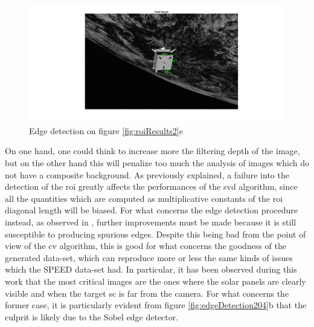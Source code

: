 \begin{figure}[htbp]
  \centering
  \includegraphics[width=1.0\textwidth]{gfx/results/prisma/164/15.png}
  \caption{Edge detection on figure \ref{fig:roiResults2}e}
  \label{fig:edgeDetection164}
\end{figure}

On one hand, one could think to increase more the filtering depth of the image, but on the other hand this will penalize too much the analysis of images which do not have a composite background.
As previously explained, a failure into the detection of the \acrshort{roi} greatly affects the performances of the \acrshort{svd} algorithm, since all the quantities which are computed as multiplicative constants of the \acrshort{roi} diagonal length will be biased.
For what concerns the edge detection procedure instead, as observed in \cite{Sharma2018}, further improvements must be made because it is still susceptible to producing spurious edges. Despite this being bad from the point of view of the \acrshort{cv} algorithm, this is good for what concerns the goodness of the generated data-set, which can reproduce more or less the same kinds of issues which the SPEED data-set had. In particular, it has been observed during this work that the most critical images are the ones where the solar panels are clearly visible and when the target \acrshort{sc} is far from the camera.
For what concerns the former case, it is particularly evident from figure \ref{fig:edgeDetection204}b that the culprit is likely due to the Sobel edge detector.

